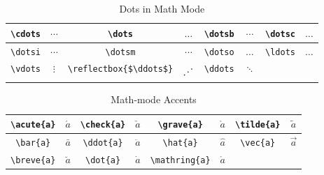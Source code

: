 \begin{table}
\caption{Dots in Math Mode}
\begin{center}
\begin{tabular}{|c|c|c|c|c|c|c|c|} \hline
\verb"\cdots"  & $\cdots$ & \verb"\dots" & $\dots$ & \verb"\dotsb" & $\dotsb$ & \verb"\dotsc" & $\dotsc$  \bigstrut \\ \hline
\verb"\dotsi"  & $\dotsi$ & \verb"\dotsm" & $\dotsm$ & \verb"\dotso" & $\dotso$ & \verb"\ldots" & $\ldots$  \bigstrut \\ \hline
\verb"\vdots"  & $\vdots$ & \verb"\reflectbox{$\ddots$}" & $\reflectbox{$\ddots$}$ & \verb"\ddots" & $\ddots$ &  &   \bigstrut \\ \hline
\end{tabular}
\end{center}
\label{tab_math_2}
\end{table}








\begin{table}
\caption{Math-mode Accents}
\begin{center}
\begin{tabular}{|c|c|c|c|c|c|c|c|} \hline
\verb"\acute{a}"  & $\acute{a}$ & \verb"\check{a}" & $\check{a}$ & \verb"\grave{a}" & $\grave{a}$ & \verb"\tilde{a}" & $\tilde{a}$  \bigstrut \\ \hline
\verb"\bar{a}"  & $\bar{a}$ & \verb"\ddot{a}" & $\ddot{a}$ & \verb"\hat{a}" & $\hat{a}$ & \verb"\vec{a}" & $\vec{a}$  \bigstrut \\ \hline
\verb"\breve{a}"  & $\breve{a}$ & \verb"\dot{a}" & $\dot{a}$ & \verb"\mathring{a}" & $\mathring{a}$ &  &   \bigstrut \\ \hline
\end{tabular}
\end{center}
\label{tab_math_3}
\end{table}








